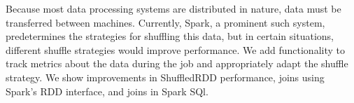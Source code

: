 % 
% 
%

Because most data processing systems are distributed in nature, data must be transferred
between machines. Currently, Spark, a prominent such system, predetermines the strategies for shuffling this data,
but in certain situations, different shuffle strategies would improve performance.
We add functionality to track metrics about the data during the job and appropriately adapt the shuffle strategy.
We show improvements in ShuffledRDD performance, joins using Spark's RDD interface, and joins in Spark SQl.

